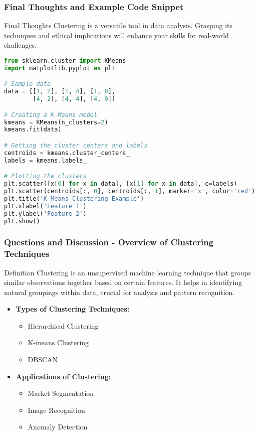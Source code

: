 \documentclass[aspectratio=169]{beamer}
\begin{document}
\begin{frame}[fragile]
    \frametitle{Final Thoughts and Example Code Snippet}
    
    \begin{block}{Final Thoughts}
        Clustering is a versatile tool in data analysis. Grasping its techniques and ethical implications will enhance your skills for real-world challenges.
    \end{block}
    
    \begin{lstlisting}[language=Python]
from sklearn.cluster import KMeans
import matplotlib.pyplot as plt

# Sample data
data = [[1, 2], [1, 4], [1, 0],
        [4, 2], [4, 4], [4, 0]]

# Creating a K-Means model
kmeans = KMeans(n_clusters=2)
kmeans.fit(data)

# Getting the cluster centers and labels
centroids = kmeans.cluster_centers_
labels = kmeans.labels_

# Plotting the clusters
plt.scatter([x[0] for x in data], [x[1] for x in data], c=labels)
plt.scatter(centroids[:, 0], centroids[:, 1], marker='x', color='red')
plt.title('K-Means Clustering Example')
plt.xlabel('Feature 1')
plt.ylabel('Feature 2')
plt.show()
    \end{lstlisting}
\end{frame}

\begin{frame}[fragile]
    \frametitle{Questions and Discussion - Overview of Clustering Techniques}
    \begin{block}{Definition}
        Clustering is an unsupervised machine learning technique that groups similar observations together based on certain features. It helps in identifying natural groupings within data, crucial for analysis and pattern recognition.
    \end{block}
    
    \begin{itemize}
        \item \textbf{Types of Clustering Techniques:}
        \begin{itemize}
            \item Hierarchical Clustering
            \item K-means Clustering
            \item DBSCAN
        \end{itemize}
        \item \textbf{Applications of Clustering:}
        \begin{itemize}
            \item Market Segmentation
            \item Image Recognition
            \item Anomaly Detection
        \end{itemize}
    \end{itemize}
\end{frame}
\end{document}

